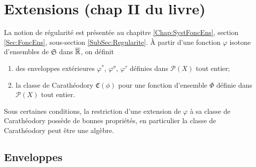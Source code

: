 \chapter{Extensions \small{(chap II du livre)}}\label{Chap:ExtenRegul}
La notion de régularité est présentée au chapitre \ref{Chap:SystFoncEns}, section \ref{Sec:FoncEns}, sous-section \ref{SubSec:Regularite}. À partir d'une fonction $\varphi$ isotone d'ensembles de $\mathfrak{S}$ dans $\overline{\mathbb{R}}$, on définit
\begin{enumerate}
 \item des enveloppes extérieures $\varphi^*$, $\varphi^\sigma$, $\varphi^\tau$ définies dans $\mathcal{P}(X)$ tout entier;
 \item la classe de Carathéodory $\mathfrak{C}(\phi)$ pour une fonction d'ensemble $\Phi$ définie dans $\mathcal{P}(X)$ tout entier.
\end{enumerate}
Sous certaines conditions, la restriction d'une extension de $\varphi$ à sa classe de Carathéodory possède de bonnes propriétés, en particulier la classe de Carathéodory peut être une algèbre.

\section{Enveloppes}\label{Sec:Enveloppes}
